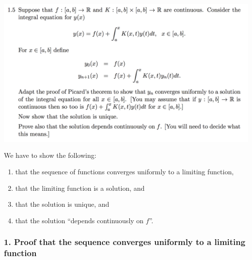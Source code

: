 \documentclass[12pt]{article}
\begin{document}
\newpage
\subsection*{}  %
\begin{mdframed}
\includegraphics[width=400pt]{img/differential-equations-a1-1-5.png}
\end{mdframed}

We have to show the following:
\begin{enumerate}
\item that the sequence of functions converges uniformly to a limiting function,
\item that the limiting function is a solution, and
\item that the solution is unique, and
\item that the solution ``depends continuously on $f$''.
\end{enumerate}

\subsubsection*{1. Proof that the sequence converges uniformly to a limiting function}
\end{document}
